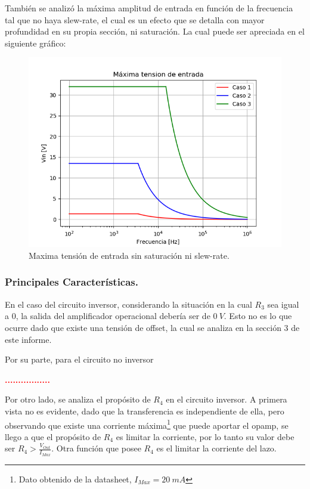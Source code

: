 También se analizó la máxima amplitud de entrada en función de la frecuencia tal que no haya slew-rate, el cual es un efecto que se detalla con mayor profundidad en su propia sección, ni saturación.
La cual puede ser apreciada en el siguiente gráfico:
\begin{figure}[H]	
	\centering
	\includegraphics[width=\textwidth]{Ejercicio1/Imagenes/maxvinsr.png}
	\caption{Maxima tensión de entrada sin saturación ni slew-rate.}
	\label{fig:MaxVinsr}
\end{figure} 
\subsubsection{Principales Características.}
En el caso del circuito inversor, considerando la situación en la cual $R_3$ sea igual a 0, la salida del amplificador operacional debería ser de $0 \ V$. Esto no es lo que ocurre dado que existe una tensión de offset, la cual se analiza en la sección 3 de este informe.


Por su parte, para el circuito no inversor
\begin{center}
\textcolor{red}{\textbf{.................}}
\end{center}

Por otro lado, se analiza el propósito de $R_4$ en el circuito inversor. A primera vista no es evidente, dado que la transferencia es independiente de ella, pero observando que existe una corriente máxima\footnote{Dato obtenido de la datasheet, $I_{Max}=20 \ mA$} que puede aportar el opamp, se llego a que el propósito de $R_4$ es limitar la corriente, por lo tanto su valor debe ser $R_4>\frac{V_{Out}}{I_{Max}}$. Otra función que posee $R_4$ es el limitar la corriente del lazo.
